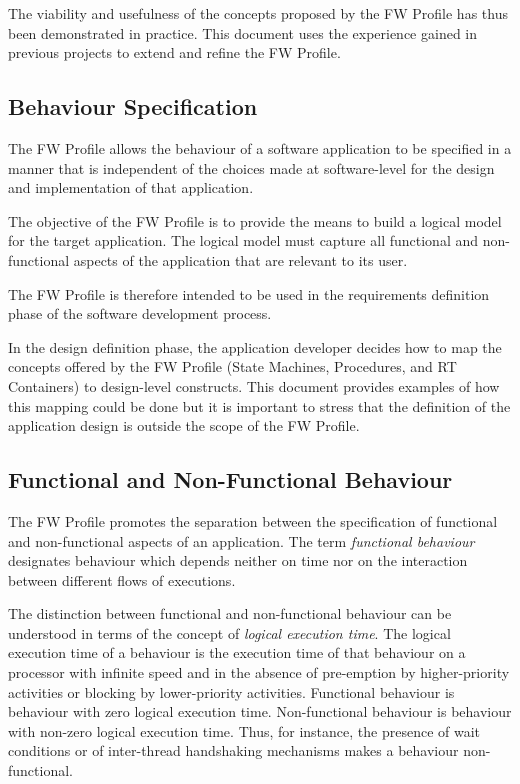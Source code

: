 \documentclass[definition]{../fwprofile}
\begin{document}
The viability and usefulness of the concepts proposed by the FW Profile has thus been
demonstrated in practice. This document uses the experience gained in previous projects
to extend and refine the FW Profile.

\subsection{Behaviour Specification}
The FW Profile allows the behaviour of a software application to be specified in a
manner that is independent of the choices made at software-level for the design and
implementation of that application.

The objective of the FW Profile is to provide the means to build a logical model for the target
application. The logical model must capture all functional and non-functional aspects of the
application that are relevant to its user.

The FW Profile is therefore intended to be used in the requirements definition phase of the
software development process.

In the design definition phase, the application developer decides how to map the concepts
offered by the FW Profile (State Machines, Procedures, and RT Containers) to design-level
constructs. This document provides examples of how this mapping could be done but it is
important to stress that the definition of the application design is outside the scope of the FW
Profile.

\subsection{Functional and Non-Functional Behaviour}\label{sec:funcAndNonFuncBehaviour} 
The FW Profile promotes the separation between the specification of functional and non-functional aspects of an application. The term \textit{functional behaviour} designates behaviour which depends neither on time nor on the interaction between different flows of executions.

The distinction between functional and non-functional behaviour can be understood in terms of the concept of \textit{logical execution time}. The logical execution time of a behaviour is the execution time of that behaviour on a processor with infinite speed and in the absence of pre-emption by higher-priority activities or blocking by lower-priority activities. Functional behaviour is behaviour with zero logical execution time. Non-functional behaviour is behaviour with non-zero logical execution time. Thus, for instance, the presence of wait conditions or of inter-thread handshaking mechanisms makes a behaviour non-functional.  
\end{document}

